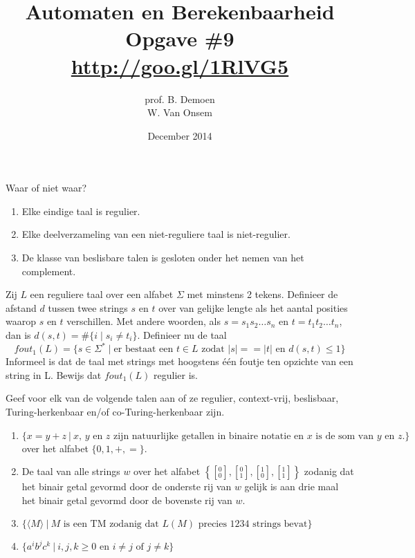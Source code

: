 \documentclass[a4paper]{article}
\title{Automaten en Berekenbaarheid\\Opgave \#9\\\url{http://goo.gl/1RlVG5}}
\author{prof. B. Demoen\\W. Van Onsem}
\date{December 2014}
\newcommand{\twar}[2]{\left[ { }^{#1}_{#2} \right] }
\begin{document}
\maketitle

\begin{question}
Waar of niet waar?
\begin{enumerate}
  \item Elke eindige taal is regulier.
  \item Elke deelverzameling van een niet-reguliere taal is niet-regulier.
  \item De klasse van beslisbare talen is gesloten onder het nemen van het complement.
\end{enumerate}
\end{question}

\begin{question}
Zij $L$ een reguliere taal over een alfabet $\Sigma$ met minstens 2 tekens. Definieer de afstand $d$ tussen twee strings $s$ en $t$ over van gelijke lengte als het aantal posities waarop $s$ en $t$ verschillen. Met andere woorden, als $s = s_1s_2\ldots s_n$ en $t = t_1t_2\ldots t_n$, dan is $d(s,t) = \#\{ i \mid s_i \neq t_i \}$. Definieer nu de taal
\[ fout_1(L) = \{s \in \Sigma^* \mid \text{er bestaat een $t \in L$ zodat $|s| == |t|$ en $d(s,t) \leq 1$} \}\]
Informeel is dat de taal met strings met hoogstens \'e\'en foutje ten opzichte van een string in L. Bewijs dat $fout_1(L)$ regulier is.
\end{question}

\begin{question}
Geef voor elk van de volgende talen aan of ze regulier, context-vrij, beslisbaar, Turing-herkenbaar en/of co-Turing-herkenbaar zijn.
\begin{enumerate}
  \item $\{ x = y+z \  | \ \text{$x$, $y$ en $z$ zijn natuurlijke getallen in binaire notatie en $x$ is de som van $y$ en $z$.} \}$ over het alfabet $\{0,1,+,=\}$.
  \item De taal van alle strings $w$ over het alfabet $\left\{ \twar{0}{0}, \twar{0}{1}, \twar{1}{0}, \twar{1}{1} \right\}$ zodanig dat het binair getal gevormd door de onderste rij van $w$ gelijk is aan drie maal het binair getal gevormd door de bovenste rij van $w$. 
  \item $\{ \langle M \rangle \ | \ \text{$M$ is een TM zodanig dat $L(M)$ precies 1234 strings bevat} \}$ %
  \item $\{ a^ib^jc^k \ | \ \text{$i,j,k \geq 0$ en $i \neq j$ of $j \neq k$} \}$ 
\end{enumerate}
\end{question}
\end{document}
